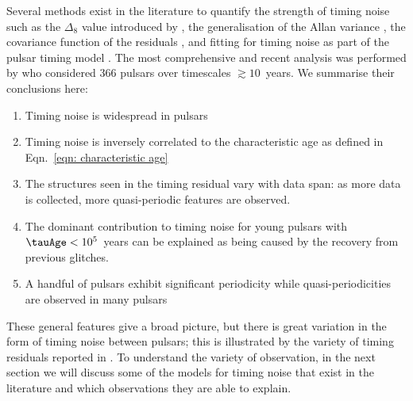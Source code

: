 Several methods exist in the literature to quantify the strength of timing
noise such as the $\Delta_{8}$ value introduced by \citet{Arzoumanian1994}, the
generalisation of the Allan variance \citep{Matsakis1997}, the covariance
function of the residuals \citep{Coles2011}, and fitting for timing noise as
part of the pulsar timing model \citep{Lentati2014}.  The most comprehensive
and recent analysis was performed by \citet{Hobbs2010} who considered 366
pulsars over timescales $\gtrsim10$~years.  We summarise their conclusions
here: \begin{enumerate}

    \item Timing noise is widespread in pulsars

    \item Timing noise is inversely correlated to the characteristic age as
          defined in Eqn.~\eqref{eqn: characteristic age}

    \item The structures seen in the timing residual vary with data span: as
more data is collected, more quasi-periodic features are observed.

    \item The dominant contribution to timing noise for young pulsars with
$\tauAge<10^{5}$~years can be explained as being caused by the recovery from
previous glitches.

    \item A handful of pulsars exhibit significant periodicity while
quasi-periodicities are observed in many pulsars

\end{enumerate}

These general features give a broad picture, but there is great variation in
the form of timing noise between pulsars; this is illustrated by the variety of
timing residuals reported in \citet{Hobbs2010}. To understand the variety of
observation, in the next section we will discuss some of the models for timing
noise that exist in the literature and which observations they are able to
explain.
